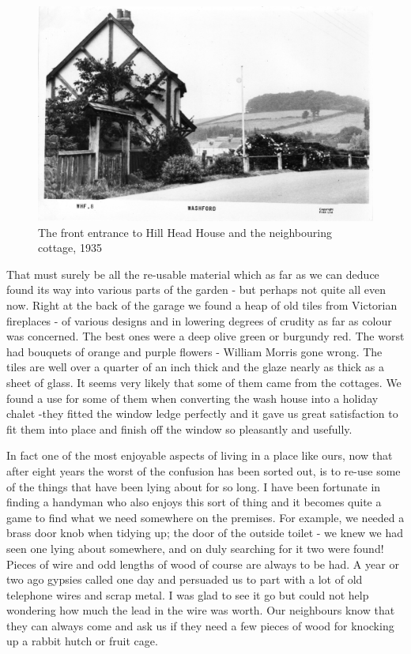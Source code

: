 \begin{figure}[p]
	\centering
     \includegraphics[width=1\textwidth]{figures/Postcard}
     \caption{The front entrance to Hill Head House and the neighbouring cottage, 1935}
     \label{fig:Postcard}
\end{figure}



That must surely be all the re-usable material which as far as we can deduce found its way into various parts of the garden - but perhaps not quite all even now. Right at the back of the garage we found a heap of old tiles from Victorian fireplaces - of various designs and in lowering degrees of crudity as far as colour was concerned. The best ones were a deep olive green or burgundy red. The worst had bouquets of orange and purple flowers - William Morris gone wrong. The tiles are well over a quarter of an inch thick and the glaze nearly as thick as a sheet of glass. It seems very likely that some of them came from the cottages. We found a use for some of them when converting the wash house into a holiday chalet -they fitted the window ledge perfectly and it gave us great satisfaction to fit them into place and finish off the window so pleasantly and usefully.

In fact one of the most enjoyable aspects of living in a place like ours, now that after eight years the worst of the confusion has been sorted out, is to re-use some of the things that have been lying about for so long. I have been fortunate in finding a handyman who also enjoys this sort of thing and it becomes quite a game to find what we need somewhere on the premises. For example, we needed a brass door knob when tidying up; the door of the outside toilet - we knew we had seen one lying about somewhere, and on duly searching for it two were found! Pieces of wire and odd lengths of wood of course are always to be had. A year or two ago gypsies called one day and persuaded us to part with a lot of old telephone wires and scrap metal. I was glad to see it go but could not help wondering how	much the lead in the wire was worth. Our neighbours know that they can always come and ask us if they need a few pieces of wood for knocking up a rabbit hutch or fruit cage.

